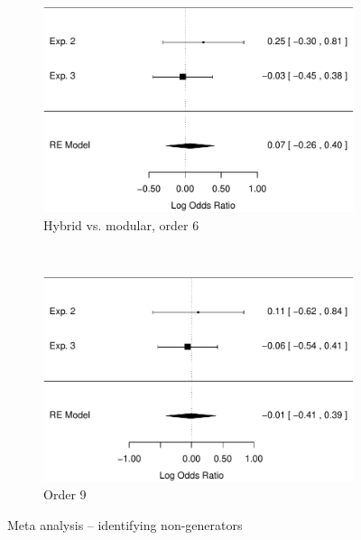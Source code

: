 \documentclass[man,10pt]{apa6}
\begin{document}
\begin{figure}
\begin{subfigure}[c]{0.4\textwidth}
\includegraphics[width=\textwidth]{figures/meta/question_typegenerator_false_6_conditionhybrid.pdf}
\caption{Hybrid vs. modular, order 6}
\end{subfigure}
~
\begin{subfigure}[c]{0.4\textwidth}
\centering
\includegraphics[width=\textwidth]{figures/meta/question_typegenerator_false_9_conditionhybrid.pdf}
\caption{Order 9}
\end{subfigure}
\caption{Meta analysis -- identifying non-generators}
\label{meta_genF}
\end{figure}\noindent 
\FloatBarrier
\end{document}
